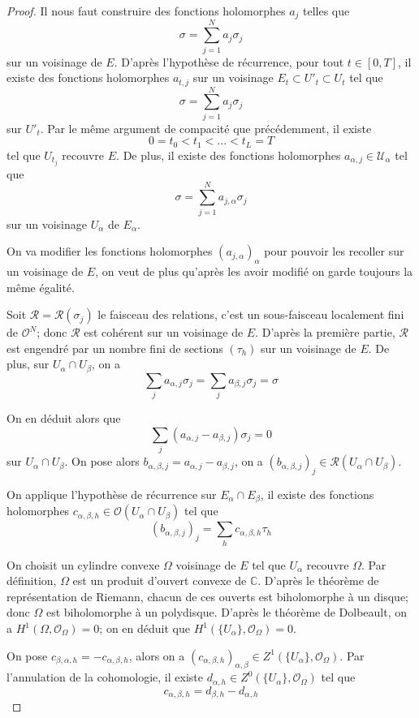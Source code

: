 \documentclass{article}
\theoremstyle{definition}
\theoremstyle{remarque}
\begin{document}
\begin{proof}
Il nous faut construire des fonctions holomorphes $a_j$ telles que 
$$\sigma = \sum_{j=1}^N a_j\sigma_j$$ sur un voisinage de $E$. D'après l'hypothèse de récurrence, pour tout $t \in [0, T]$, il existe des fonctions holomorphes $a_{t,j}$ sur un voisinage $E_t \subset U'_t \subset U_t$ tel que
$$\sigma = \sum_{j=1}^N a_j\sigma_j$$
sur $U'_t$. Par le même argument de compacité que précédemment, il existe $$0 = t_0 < t_1 < ... < t_L = T$$ tel que ${U_{t_j}}$ recouvre $E$. De plus, il existe des fonctions holomorphes $a_{\alpha,j} \in \mathcal{U_\alpha}$ tel que $$\sigma = \sum_{j=1}^N a_{j, \alpha}\sigma_j$$ sur un voisinage $U_\alpha$ de $E_\alpha$.

On va modifier les fonctions holomorphes $(a_{j, \alpha})_\alpha$ pour pouvoir les recoller sur un voisinage de $E$, on veut de plus qu'après les avoir modifié on garde toujours la même égalité.

Soit $\mathcal{R} = \mathcal{R}(\sigma_j)$ le faisceau des relations, c'est un sous-faisceau localement fini de $\mathcal{O}^N$; donc $\mathcal{R}$ est cohérent sur un voisinage de $E$. D'après la première partie, $\mathcal{R}$ est engendré par un nombre fini de sections $(\tau_h)$ sur un voisinage de $E$. De plus, sur $U_\alpha \cap U_\beta$, on a $$\sum_j a_{\alpha,j}\sigma_j =\sum_j a_{\beta,j}\sigma_j = \sigma$$

On en déduit alors que
$$\sum_j (a_{\alpha,j} - a_{\beta,j})\sigma_j = 0$$ sur $U_\alpha \cap U_\beta$. On pose alors $b_{\alpha, \beta, j} = a_{\alpha,j} - a_{\beta,j}$, on a $(b_{\alpha, \beta, j})_j \in \mathcal{R}(U_\alpha \cap U_\beta)$.

On applique l'hypothèse de récurrence sur $E_\alpha \cap E_\beta$, il existe des fonctions holomorphes $c_{\alpha,\beta,h} \in \mathcal{O}(U_\alpha \cap U_\beta)$ tel que
$$(b_{\alpha,\beta,j})_j = \sum_h c_{\alpha,\beta,h}\tau_h$$

On choisit un cylindre convexe $\Omega$ voisinage de $E$ tel que ${U_\alpha}$ recouvre $\Omega$. Par définition, $\Omega$ est un produit d'ouvert convexe de $\mathbb{C}$. D'après le théorème de représentation de Riemann, chacun de ces ouverts est biholomorphe à un disque; donc $\Omega$ est biholomorphe à un polydisque. D'après le théorème de Dolbeault, on a $H^1(\Omega, \mathcal{O}_\Omega)=0$; on en déduit que $H^1(\{U_\alpha\}, \mathcal{O}_\Omega)=0$.

On pose $c_{\beta, \alpha, h} = - c_{\alpha, \beta, h}$, alors on a $(c_{\alpha,\beta,h})_{\alpha,\beta} \in Z^1(\{U_\alpha\}, \mathcal{O}_\Omega)$. Par l'annulation de la cohomologie, il existe $d_{\alpha, h} \in Z^0(\{U_\alpha\}, \mathcal{O}_\Omega)$ tel que $$c_{\alpha, \beta, h} = d_{\beta, h} - d_{\alpha, h}$$


\end{proof}
\end{document}
